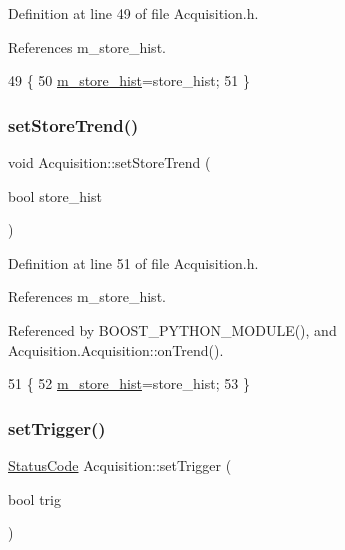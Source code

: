 Definition at line 49 of file Acquisition.\+h.



References m\+\_\+store\+\_\+hist.


\begin{DoxyCode}
49                                      \{
50     \hyperlink{classAcquisition_a08f70edd83751dbdab4c8190dc4b9188}{m\_store\_hist}=store\_hist;
51   \}
\end{DoxyCode}
\mbox{\label{classAcquisition_a1ceff272a1ad030dcd20c0dcddc65443}} 
\subsubsection{\texorpdfstring{set\+Store\+Trend()}{setStoreTrend()}\hspace{0.1cm}{\footnotesize\ttfamily [2/2]}}
{\footnotesize\ttfamily void Acquisition\+::set\+Store\+Trend (\begin{DoxyParamCaption}\item[{bool}]{store\+\_\+hist }\end{DoxyParamCaption})\hspace{0.3cm}{\ttfamily [inline]}}



Definition at line 51 of file Acquisition.\+h.



References m\+\_\+store\+\_\+hist.



Referenced by B\+O\+O\+S\+T\+\_\+\+P\+Y\+T\+H\+O\+N\+\_\+\+M\+O\+D\+U\+L\+E(), and Acquisition.\+Acquisition\+::on\+Trend().


\begin{DoxyCode}
51                                      \{
52     \hyperlink{classAcquisition_a08f70edd83751dbdab4c8190dc4b9188}{m\_store\_hist}=store\_hist;
53   \}
\end{DoxyCode}
\mbox{\label{classAcquisition_acdb167b43f3babb59a98698aa5c5066f}} 
\subsubsection{\texorpdfstring{set\+Trigger()}{setTrigger()}\hspace{0.1cm}{\footnotesize\ttfamily [1/2]}}
{\footnotesize\ttfamily \hyperlink{classStatusCode}{Status\+Code} Acquisition\+::set\+Trigger (\begin{DoxyParamCaption}\item[{bool}]{trig }\end{DoxyParamCaption})\hspace{0.3cm}{\ttfamily [inline]}}



